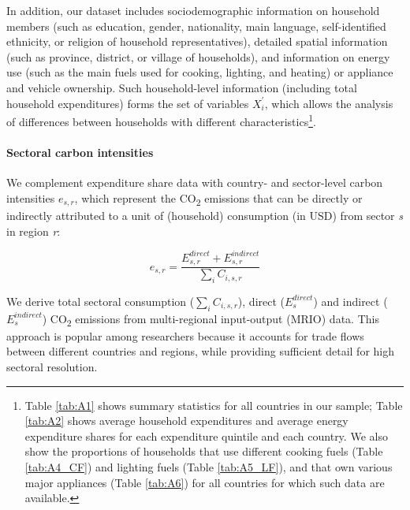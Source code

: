 \documentclass[12pt, a4paper]{article}
\begin{document}
In addition, our dataset includes sociodemographic information on household members (such as education, gender, nationality, main language, self-identified ethnicity, or religion of household representatives), detailed spatial information (such as province, district, or village of households), and information on energy use (such as the main fuels used for cooking, lighting, and heating) or appliance and vehicle ownership. Such household-level information (including total household expenditures) forms the set of variables $X_{i}^{'}$, which allows the analysis of differences between households with different characteristics\footnote{Table \ref{tab:A1} shows summary statistics for all countries in our sample; Table \ref{tab:A2} shows average household expenditures and average energy expenditure shares for each expenditure quintile and each country. We also show the proportions of households that use different cooking fuels (Table \ref{tab:A4_CF}) and lighting fuels (Table \ref{tab:A5_LF}), and that own various major appliances (Table \ref{tab:A6}) for all countries for which such data are available.}.

\paragraph{Sectoral carbon intensities} We complement expenditure share data with country- and sector-level carbon intensities $e_{s,r}$, which represent the  CO\textsubscript{2} emissions that can be directly or indirectly attributed to a unit of (household) consumption (in USD) from sector \textit{s} in region \textit{r}:

\begin{equation}
    e_{s,r} = \frac{E_{s,r}^{direct}+E_{s,r}^{indirect}}{\sum_{i} C_{i,s,r}}
\end{equation}

We derive total sectoral consumption ($\sum_{i} C_{i,s,r}$), direct ($E_{s}^{direct}$) and indirect ($E_{s}^{indirect}$) CO\textsubscript{2} emissions from  multi-regional input-output (MRIO) data. This approach is popular among researchers because it accounts for trade flows between different countries and regions, while providing sufficient detail for high sectoral resolution. 
\end{document}
